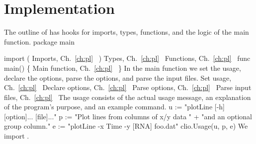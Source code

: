 \section*{Implementation}
The outline of  has hooks for imports, types, functions,
and the logic of the main function.
\nwenddocs{}\endmoddef\nwstartdeflinemarkup\nwenddeflinemarkup
package main

import (
          \LA{}Imports, Ch.~\ref{ch:pl}~{\nwtagstyle{}}\RA{}
)
\LA{}Types, Ch.~\ref{ch:pl}~{\nwtagstyle{}}\RA{}
\LA{}Functions, Ch.~\ref{ch:pl}~{\nwtagstyle{}}\RA{}
func main() \{
          \LA{}Main function, Ch.~\ref{ch:pl}~{\nwtagstyle{}}\RA{}
\}
\nwendcode{}\nwdocspar
In the main function we set the usage, declare the options, parse the
options, and parse the input files.
\nwenddocs{}\endmoddef\nwstartdeflinemarkup{}\nwenddeflinemarkup
\LA{}Set usage, Ch.~\ref{ch:pl}~{\nwtagstyle{}}\RA{}
\LA{}Declare options, Ch.~\ref{ch:pl}~{\nwtagstyle{}}\RA{}
\LA{}Parse options, Ch.~\ref{ch:pl}~{\nwtagstyle{}}\RA{}
\LA{}Parse input files, Ch.~\ref{ch:pl}~{\nwtagstyle{}}\RA{}
\nwendcode{}\nwdocspar
The usage consists of the actual usage message, an explanation of the
program's purpose, and an example command.
\nwenddocs{}\endmoddef\nwstartdeflinemarkup{}\nwenddeflinemarkup
u := "plotLine [-h] [option]... [file]..."
p := "Plot lines from columns of x/y data " +
          "and an optional group column."
e := "plotLine -x Time -y [RNA] foo.dat"
clio.Usage(u, p, e)
\nwendcode{}\nwdocspar
We import .
\nwenddocs{}\endmoddef\nwstartdeflinemarkup{}\nwenddeflinemarkup
